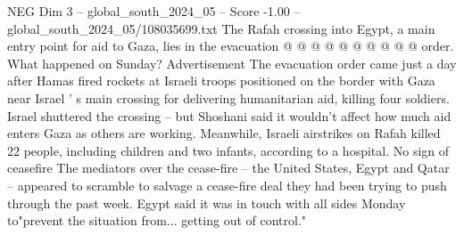 \begin{textsample}{NEG Dim 3 – global\_south\_2024\_05 – Score -1.00 – global\_south\_2024\_05/108035699.txt}
The Rafah crossing into Egypt, a main entry point for aid to Gaza, lies in the evacuation @ @ @ @ @ @ @ @ @ @ order.
What happened on Sunday?
Advertisement The evacuation order came just a day after Hamas fired rockets at Israeli troops positioned on the border with Gaza near Israel ' s main crossing for delivering humanitarian aid, killing four soldiers.
Israel shuttered the crossing -- but Shoshani said it wouldn't affect how much aid enters Gaza as others are working.
Meanwhile, Israeli airstrikes on Rafah killed 22 people, including children and two infants, according to a hospital.
No sign of ceasefire The mediators over the cease-fire -- the United States, Egypt and Qatar -- appeared to scramble to salvage a cease-fire deal they had been trying to push through the past week.
Egypt said it was in touch with all sides Monday to"prevent the situation from... getting out of control."

\end{textsample}
